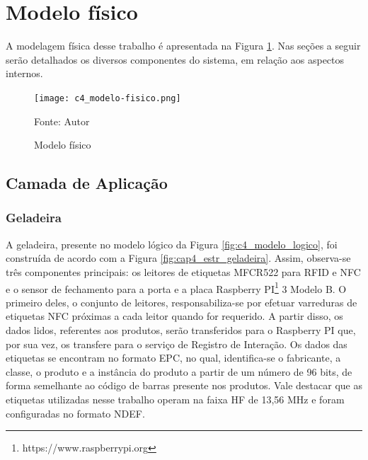 
\section{Modelo físico}


A modelagem física desse trabalho é apresentada na Figura \ref{fig:c4_modelo_fisico}. Nas seções a seguir serão detalhados os diversos componentes do sistema, em relação aos aspectos internos.


\begin{figure}[htb]
    \caption{Modelo físico}
    \label{fig:c4_modelo_fisico}
    \texttt{[image: c4\_modelo-fisico.png]}
    
    \footnotesize{Fonte: Autor}
\end{figure}

\subsection{Camada de Aplicação}

\subsubsection{Geladeira}

A geladeira, presente no modelo lógico da Figura \ref{fig:c4_modelo_logico}, foi construída de acordo com a Figura \ref{fig:cap4_estr_geladeira}. Assim, observa-se três componentes principais: os leitores de etiquetas MFCR522 para RFID e NFC e o sensor de fechamento para a porta e a placa Raspberry PI\textsuperscript{\textregistered}\footnote{https://www.raspberrypi.org} 3 Modelo B. O primeiro deles, o conjunto de leitores, responsabiliza-se por efetuar varreduras de etiquetas NFC próximas a cada leitor quando for requerido. A partir disso, os dados lidos, referentes aos produtos, serão transferidos para o Raspberry PI que, por sua vez, os transfere para o serviço de Registro de Interação. Os dados das etiquetas se encontram no formato EPC, no qual, identifica-se o fabricante, a classe, o produto e a instância do produto a partir de um número de 96 bits, de forma semelhante ao código de barras presente nos produtos. Vale destacar que as etiquetas utilizadas nesse trabalho operam na faixa HF de 13,56 MHz e foram configuradas no formato NDEF.

